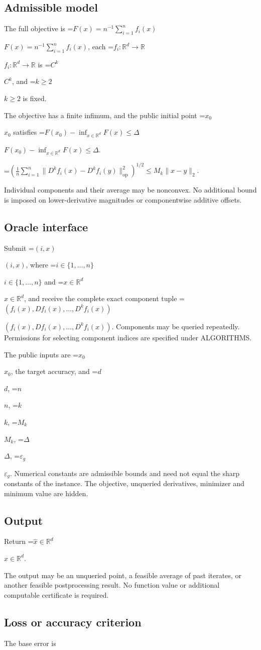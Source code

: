 \documentclass[10pt,a4paper]{article}
\newcommand{\AtlasMath}[1]{\par\begingroup\centering\setbox0=\hbox{$\displaystyle #1$}\ifdim\wd0>1.4\linewidth\typeout{ATLAS WIDE FORMULA: \the\wd0}\fi\ifdim\wd0>\linewidth\resizebox{\linewidth}{!}{\box0}\else\box0\fi\par\endgroup}
\newcommand{\AtlasInlineMath}[1]{\begingroup\setbox0=\hbox{$#1$}\ifdim\wd0>.4\linewidth\endgroup\AtlasMath{#1}\else\endgroup$#1$\fi}
\begin{document}
\subsection{Admissible model}
The full objective is \AtlasInlineMath{F(x)=n^{-1}\sum_{i=1}^n f_i(x)}, each \AtlasInlineMath{f_i:\mathbb{R}^d\to\mathbb{R}} is \AtlasInlineMath{C^k}, and \AtlasInlineMath{k\ge2} is fixed.

The objective has a finite infimum, and the public initial point \AtlasInlineMath{x_0} satisfies \AtlasInlineMath{F(x_0)-\inf_{x\in \mathbb{R}^d}F(x)\le\Delta}.


\AtlasMath{\left(\frac1n\sum_{i=1}^n\|D^kf_i(x)-D^kf_i(y)\|_{\mathrm{op}}^2\right)^{1/2}\le M_k\|x-y\|_2.}


Individual components and their average may be nonconvex. No additional bound is imposed on lower-derivative magnitudes or componentwise additive offsets.

\subsection{Oracle interface}
Submit \AtlasInlineMath{(i,x)}, where \AtlasInlineMath{i\in\{1,\ldots,n\}} and \AtlasInlineMath{x\in\mathbb{R}^d}, and receive the complete exact component tuple \AtlasInlineMath{(f_i(x),Df_i(x),\ldots,D^{k}f_i(x))}. Components may be queried repeatedly. Permissions for selecting component indices are specified under ALGORITHMS.

The public inputs are \AtlasInlineMath{x_0}, the target accuracy, and \AtlasInlineMath{d}, \AtlasInlineMath{n}, \AtlasInlineMath{k}, \AtlasInlineMath{M_k}, \AtlasInlineMath{\Delta}, \AtlasInlineMath{\varepsilon_g}. Numerical constants are admissible bounds and need not equal the sharp constants of the instance. The objective, unqueried derivatives, minimizer and minimum value are hidden.

\subsection{Output}
Return \AtlasInlineMath{\widehat{x}\in \mathbb{R}^d}.

The output may be an unqueried point, a feasible average of past iterates, or another feasible postprocessing result. No function value or additional computable certificate is required.

\subsection{Loss or accuracy criterion}
The base error is
\end{document}
